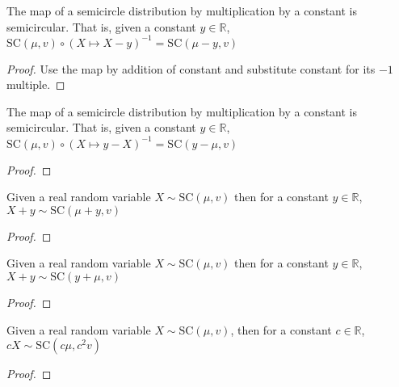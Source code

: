 \begin{lemma}\label{lem:semicircleReal_map_sub_const}
  \mathlibok
   The map of a semicircle distribution by multiplication by a constant is semicircular. That is,
  given a constant $y \in \mathbb{R}$, $ \mathrm{SC}(\mu, v) \circ (X  \mapsto X - y )^{-1} = \mathrm{SC}(\mu - y  , v)$
  \begin{proof}
   Use the map by addition of constant and substitute constant for its $-1$ multiple.
  \end{proof}

\end{lemma}

\begin{lemma}\label{lem:semicircleReal_map_const_sub}
  \mathlibok
  The map of a semicircle distribution by multiplication by a constant is semicircular. That is,
  given a constant $y \in \mathbb{R}$, $ \mathrm{SC}(\mu, v) \circ (X \mapsto y-X  )^{-1} = \mathrm{SC}(y-\mu  , v)$
  \begin{proof}

  \end{proof}
\end{lemma}

\begin{lemma}\label{lem:semicircleReal_add_const}
  \mathlibok
  \uses{}
  Given a real random variable $X \sim \mathrm{SC}(\mu, v)$
  then for a constant $y \in \mathbb{R}$, $X + y \sim \mathrm{SC}(\mu + y, v)$
  \begin{proof}

  \end{proof}
\end{lemma}

\begin{lemma}\label{lem:semicircleReal_const_add}
  \mathlibok
  \uses{}
  Given a real random variable $X \sim \mathrm{SC}(\mu, v)$
  then for a constant $y \in \mathbb{R}$, $X + y \sim \mathrm{SC}(y + \mu, v)$
  \begin{proof}

  \end{proof}
\end{lemma}

\begin{lemma}\label{lem:semicircleReal_const_mul}
  \mathlibok
  \uses{}
  Given a real random variable $X \sim \mathrm{SC}(\mu, v)$,
  then for a constant $c \in \mathbb{R}$, $cX \sim \mathrm{SC}(c\mu , c^2v)$
  \begin{proof}

  \end{proof}
\end{lemma}

